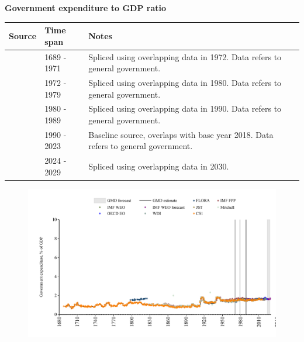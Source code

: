 \documentclass[12pt,a4paper,landscape]{article}
\begin{document}
\begin{adjustbox}{max totalsize={\paperwidth}{\paperheight},center}
\begin{minipage}[t][\textheight][t]{\textwidth}
\vspace*{0.5cm}
{}
\begin{center}
{\Large\bfseries Government expenditure to GDP ratio}
\end{center}
\vspace{0.5cm}
\begin{table}[H]
\centering
\small
\begin{tabular}{|l|l|l|}
\hline
\textbf{Source} & \textbf{Time span} & \textbf{Notes} \\
\hline
\rowcolor{white}\cite{CS1_GBR}& 1689 - 1971 &Spliced using overlapping data in 1972. Data refers to general government.\\
\rowcolor{lightgray}\cite{WDI}& 1972 - 1979 &Spliced using overlapping data in 1980. Data refers to general government.\\
\rowcolor{white}\cite{IMF_WEO}& 1980 - 1989 &Spliced using overlapping data in 1990. Data refers to general government.\\
\rowcolor{lightgray}\cite{OECD_EO}& 1990 - 2023 &Baseline source, overlaps with base year 2018. Data refers to general government.\\
\rowcolor{white}\cite{IMF_WEO_forecast}& 2024 - 2029 &Spliced using overlapping data in 2030. \\
\hline
\end{tabular}
\end{table}
\begin{figure}[H]
\centering
\includegraphics[width=\textwidth,height=0.6\textheight,keepaspectratio]{graphs/GBR_govexp_GDP.pdf}
\end{figure}
\end{minipage}
\end{adjustbox}
\end{document}
